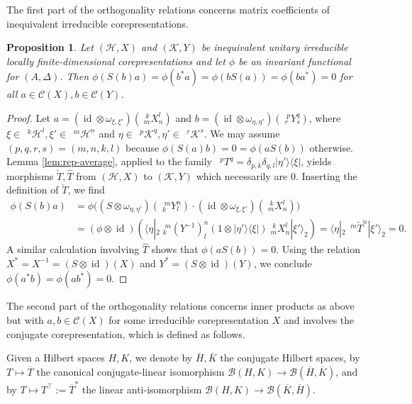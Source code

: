 \documentclass[12pt]{article}
\theoremstyle{change}
\DeclareMathOperator{\id}{id}
\newcommand{\Gr}[5]{\;{}^{\;#2}_{#4}#1_{#5}^{#3}}%
\newcommand{\Gru}[3]{\;{}^{\;#2}#1^{#3}}
\newtheorem{Prop}[Theorem]{Proposition}
\theoremstyle{definition}
\numberwithin{equation}{section}
\begin{document}
The first part of the orthogonality relations concerns matrix
coefficients of inequivalent irreducible corepresentations.
\begin{Prop} \label{prop:rep-orthogonality-1}
  Let $(\mathcal{H},X)$ and $(\mathcal{K},Y)$ be inequivalent unitary
  irreducible locally finite-dimensional corepresentations and let
  $\phi$ be an invariant functional for $(A,\Delta)$.  Then
  $\phi(S(b)a) =\phi(b^{*}a) = \phi(bS(a))=\phi(ba^{*})=0$ for all
  $a\in \mathcal{C}(X), b \in \mathcal{C}(Y)$.
\end{Prop}
\begin{proof}
  Let $a=(\id \otimes \omega_{\xi,\xi'})(\Gr{X}{k}{l}{m}{n})$ and
  $b=(\id \otimes \omega_{\eta,\eta'})(\Gr{Y}{p}{q}{r}{s})$, where
  $\xi \in \Gru{\mathcal{H}}{k}{l}, \xi' \in \Gru{\mathcal{H}}{m}{n}$
  and $\eta \in \Gru{\mathcal{K}}{p}{q}, \eta' \in
  \Gru{\mathcal{K}}{r}{s}$. We may assume $(p,q,r,s) = (m,n,k,l)$
  because $\phi(S(a)b) = 0 = \phi(aS(b))$ otherwise.  
Lemma \ref{lem:rep-average}, applied to the 
  family $\Gru{T}{p}{q}= \delta_{p,k}\delta_{q,l}
  |\eta'\rangle\langle\xi|$, yields  morphisms $\check{T},\hat{T}$
  from $(\mathcal{H},X)$ to $(\mathcal{K},Y)$ which necessarily are
  $0$. Inserting the definition of $\check{T}$, we find
  \begin{align*}
    \phi(S(b)a) &= \phi\big((S \otimes
    \omega_{\eta,\eta'})(\Gr{Y}{m}{n}{k}{l}) \cdot (\id \otimes
    \omega_{\xi,\xi'})(\Gr{X}{k}{l}{m}{n})\big) \\ &= (\phi \otimes
    \id)\left(\langle\eta|_{2} \Gr{(Y^{-1})}{m}{n}{k}{l}(1 \otimes
      |\eta'\rangle\langle \xi|)
      \Gr{X}{k}{l}{m}{n}|\xi'\rangle_{2}\right) 
    = \langle \eta|_{2} \Gru{\check{T}}{m}{n}|\xi'\rangle_{2} = 0.
  \end{align*}
  A similar calculation involving $\hat{T}$ shows that
  $\phi(aS(b))=0$.  Using the relation $X^{*}=X^{-1}=(S\otimes
  \id)(X)$ and $Y^{*}=(S\otimes \id)(Y)$, we conclude
  $\phi(a^{*}b)=\phi(ab^{*})=0$.
\end{proof}

The second part of the orthogonality relations concerns inner products
as above but with $a,b\in \mathcal{C}(X)$ for some irreducible
corepresentation  $X$  and involves the conjugate corepresentation,
which is defined as follows.



Given a Hilbert spaces $H,K$, we denote by $\overline{H},\overline{K}$
the conjugate Hilbert spaces, by $T \mapsto \overline{T}$ the
canonical conjugate-linear isomorphism $\mathcal{B}(H,K) \to
\mathcal{B}(\overline{H},\overline{K})$, and by $T \mapsto
T^{\top}:=\overline{T}^{*}$ the linear anti-isomorphism
$\mathcal{B}(H,K) \to \mathcal{B}(\overline{K},\overline{H})$.
\end{document}
